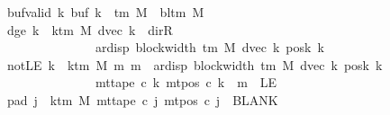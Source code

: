 \begin{isabellebody}
\ \ \ \ \ \ \ buf{\isacharunderscore}{\kern0pt}valid{\isacharcolon}{\kern0pt}\ {\isachardoublequoteopen}{\isasymforall}k{\isachardot}{\kern0pt}\ buf{}\ k\ {\isasymin}\ {\isasymGamma}{\isacharunderscore}{\kern0pt}tm\ M\ {\isasymunion}\ {\isacharbraceleft}{\kern0pt}bl{\isacharunderscore}{\kern0pt}tm\ M{\isacharbraceright}{\kern0pt}{\isachardoublequoteclose}\isanewline
\ \ \ \ \ \ \ dge{}{\isacharcolon}{\kern0pt}\ {\isachardoublequoteopen}{\isasymforall}k\ {\isacharless}{\kern0pt}\ k{\isacharunderscore}{\kern0pt}tm\ M{\isachardot}{\kern0pt}\ dvec\ k\ {\isasymnoteq}\ dir{\isachardot}{\kern0pt}R\isanewline
\ \ \ \ \ \ \ \ \ \ \ \ \ \ \ \ \ \ {\isasymlongrightarrow}\ {}\ {\isacharless}{\kern0pt}\ ar{\isacharunderscore}{\kern0pt}disp\ {\isacharparenleft}{\kern0pt}block{\isacharunderscore}{\kern0pt}width\ {\isacharparenleft}{\kern0pt}{\isasymGamma}{\isacharunderscore}{\kern0pt}tm\ M{\isacharparenright}{\kern0pt}{\isacharparenright}{\kern0pt}\ {\isacharparenleft}{\kern0pt}dvec\ k{\isacharparenright}{\kern0pt}\ {\isacharparenleft}{\kern0pt}posk{}\ k{\isacharparenright}{\kern0pt}{\isachardoublequoteclose}\isanewline
\ \ \ \ \ \ \ notLE{\isacharcolon}{\kern0pt}\ {\isachardoublequoteopen}{\isasymforall}k\ {\isacharless}{\kern0pt}\ k{\isacharunderscore}{\kern0pt}tm\ M{\isachardot}{\kern0pt}\ {\isasymforall}m{\isachardot}{\kern0pt}\ m\ {\isacharless}{\kern0pt}\ ar{\isacharunderscore}{\kern0pt}disp\ {\isacharparenleft}{\kern0pt}block{\isacharunderscore}{\kern0pt}width\ {\isacharparenleft}{\kern0pt}{\isasymGamma}{\isacharunderscore}{\kern0pt}tm\ M{\isacharparenright}{\kern0pt}{\isacharparenright}{\kern0pt}\ {\isacharparenleft}{\kern0pt}dvec\ k{\isacharparenright}{\kern0pt}\ {\isacharparenleft}{\kern0pt}posk{}\ k{\isacharparenright}{\kern0pt}\isanewline
\ \ \ \ \ \ \ \ \ \ \ \ \ \ \ \ \ \ \ \ {\isasymlongrightarrow}\ mt{\isacharunderscore}{\kern0pt}tape\ c{}\ k\ {\isacharparenleft}{\kern0pt}mt{\isacharunderscore}{\kern0pt}pos\ c{}\ k\ {\isacharminus}{\kern0pt}\ m{\isacharparenright}{\kern0pt}\ {\isasymnoteq}\ LE{}{\isachardoublequoteclose}\isanewline
\ \ \ \ \ \ \ pad{}{\isacharcolon}{\kern0pt}\ {\isachardoublequoteopen}{\isasymforall}j\ {\isasymge}\ k{\isacharunderscore}{\kern0pt}tm\ M{\isachardot}{\kern0pt}\ mt{\isacharunderscore}{\kern0pt}tape\ c{}\ j\ {\isacharparenleft}{\kern0pt}mt{\isacharunderscore}{\kern0pt}pos\ c{}\ j{\isacharparenright}{\kern0pt}\ {\isacharequal}{\kern0pt}\ BLANK{}{\isachardoublequoteclose}\isanewline

\end{isabellebody}
